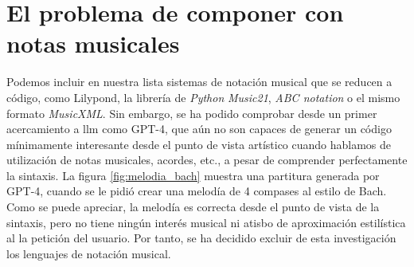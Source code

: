     
\section{El problema de componer con notas musicales}

Podemos incluir en nuestra lista sistemas de notación musical que se reducen a código, como Lilypond, la librería de \textit{Python} \textit{Music21}, \textit{ABC notation} o el mismo formato \textit{MusicXML}. Sin embargo, se ha podido comprobar desde un primer acercamiento a \gls{llm} como GPT-4, que aún no son capaces de generar un código mínimamente interesante desde el punto de vista artístico cuando hablamos de utilización de notas musicales, acordes, etc., a pesar de comprender perfectamente la sintaxis. La figura \ref{fig:melodia_bach} muestra una partitura generada por GPT-4, cuando se le pidió crear una melodía de 4 compases al estilo de Bach. Como se puede apreciar, la melodía es correcta desde el punto de vista de la sintaxis, pero no tiene ningún interés musical ni atisbo de aproximación estilística al la petición del usuario. Por tanto, se ha decidido excluir de esta investigación los lenguajes de notación musical.

